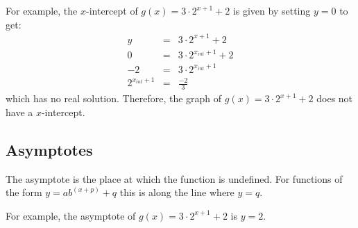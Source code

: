 For example, the $x$-intercept of $g(x)=3\cdot 2^{x+1} + 2$ is given by setting $y=0$ to get:
\begin{eqnarray*}
y&=&3\cdot 2^{x+1} + 2\\
0&=&3\cdot 2^{x_{int}+1} + 2\\
-2&=&3\cdot 2^{x_{int}+1}\\
2^{x_{int}+1}&=&\frac{-2}{3}
\end{eqnarray*}
which has no real solution. Therefore, the graph of $g(x)=3\cdot 2^{x+1} + 2$ does not have a $x$-intercept.


\subsection{Asymptotes}
The asymptote is the place at which the function is undefined.  For functions of the form $y=ab^{(x+p)} + q$ this is along the line where $y = q$.

For example, the asymptote of $g(x)=3\cdot 2^{x+1} + 2$ is $y = 2$.


